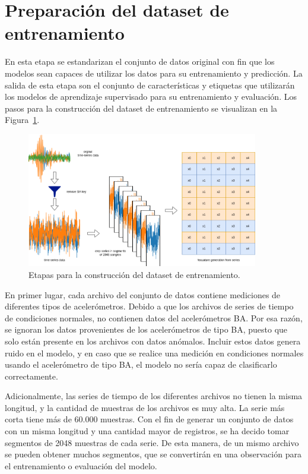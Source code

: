\documentclass[11pt,a4paper,spanish]{book}
\numberwithin{equation}{chapter}
\numberwithin{figure}{chapter}
\begin{document}
\section{Preparación del dataset de entrenamiento}

En esta etapa se estandarizan el conjunto de datos original con fin que los modelos sean 
capaces de utilizar los datos para su entrenamiento y predicción. La salida de esta etapa
son el conjunto de características y etiquetas que utilizarán los modelos de aprendizaje 
supervisado para su entrenamiento y evaluación. Los pasos para la construcción del dataset 
de entrenamiento se visualizan en la Figura~\ref{fig:figGenerationDataset}.


\begin{figure}[h]
    \centering
    \includegraphics[width=0.9\textwidth]{media/generacion-dataset.drawio.png}
    \caption{Etapas para la construcción del dataset de entrenamiento.}
    \label{fig:figGenerationDataset}
\end{figure}


En primer lugar, cada archivo del conjunto de datos contiene mediciones de diferentes 
tipos de acelerómetros. Debido a que los archivos de series de tiempo de condiciones 
normales, no contienen datos del acelerómetros BA. Por esa razón, se ignoran los datos 
provenientes de los acelerómetros de tipo BA, puesto que solo están presente en los 
archivos con datos anómalos. Incluir estos datos genera ruido en el modelo, y en caso 
que se realice una medición en condiciones normales usando el acelerómetro de tipo BA, 
el modelo no sería capaz de clasificarlo correctamente.


Adicionalmente, las series de tiempo de los diferentes archivos no tienen la misma 
longitud, y la cantidad de muestras de los archivos es muy alta. La serie más corta 
tiene más de 60.000 muestras. Con el fin de generar un conjunto de datos con un misma 
longitud y una cantidad mayor de registros, se ha decido tomar segmentos de 2048 
muestras de cada serie.  De esta manera, de un mismo archivo se pueden obtener muchos 
segmentos, que se convertirán en una observación para el entrenamiento o evaluación 
del modelo. 
\end{document}
